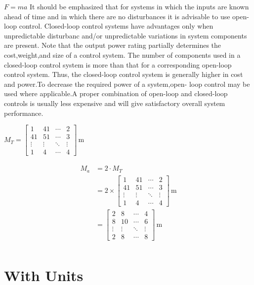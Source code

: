 \documentclass{report}
\begin{document}
$F = ma$ It should be emphasized that for systems in which the inputs are known ahead of time and in which there are no disturbances it is advisable to use open-loop control.  Closed-loop control systems have advantages only when unpredictable disturbanc  and/or unpredictable variations in system components are present. Note that the  output power rating partially determines the cost,weight,and size of a control system.  The number of components used in a closed-loop control system is more than that for  a corresponding open-loop control system. Thus, the closed-loop control system is generally higher in cost and power.To decrease the required power of a system,open-  loop control may be used where applicable.A proper combination of open-loop and  closed-loop controls is usually less expensive and will give satisfactory overall system  performance.

$M_{T} = \left[\begin{matrix}1 & 4 1 & \cdots & 2\\4 1 & 5 1 & \cdots & 3\\\vdots & \vdots & \ddots & \vdots\\1 & 4 & \cdots & 4\end{matrix}\right]\,\mathrm{m}$ 

\begin{align}
\begin{split}
M_{a}	&= 2 \cdot M_{T}\\
		&= 2 \times \left[\begin{matrix}1 & 4 1 & \cdots & 2\\4 1 & 5 1 & \cdots & 3\\\vdots & \vdots & \ddots & \vdots\\1 & 4 & \cdots & 4\end{matrix}\right]\,\mathrm{m}\\
		&= \left[\begin{matrix}2 & 8 & \cdots & 4\\8 & 10 & \cdots & 6\\\vdots & \vdots & \ddots & \vdots\\2 & 8 & \cdots & 8\end{matrix}\right]\,\mathrm{m}\\
\end{split}
\end{align}

\section{With Units}
\end{document}
